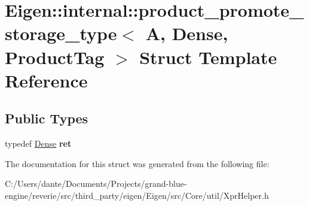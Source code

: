 \hypertarget{struct_eigen_1_1internal_1_1product__promote__storage__type_3_01_a_00_01_dense_00_01_product_tag_01_4}{}\section{Eigen\+::internal\+::product\+\_\+promote\+\_\+storage\+\_\+type$<$ A, Dense, Product\+Tag $>$ Struct Template Reference}
\label{struct_eigen_1_1internal_1_1product__promote__storage__type_3_01_a_00_01_dense_00_01_product_tag_01_4}
\subsection*{Public Types}
\begin{DoxyCompactItemize}
\item 
\mbox{\label{struct_eigen_1_1internal_1_1product__promote__storage__type_3_01_a_00_01_dense_00_01_product_tag_01_4_ad5f8e6a11d822628b5eaf0d9ca724834}} 
typedef \mbox{\hyperlink{struct_eigen_1_1_dense}{Dense}} {\bfseries ret}
\end{DoxyCompactItemize}


The documentation for this struct was generated from the following file\+:\begin{DoxyCompactItemize}
\item 
C\+:/\+Users/dante/\+Documents/\+Projects/grand-\/blue-\/engine/reverie/src/third\+\_\+party/eigen/\+Eigen/src/\+Core/util/Xpr\+Helper.\+h\end{DoxyCompactItemize}
